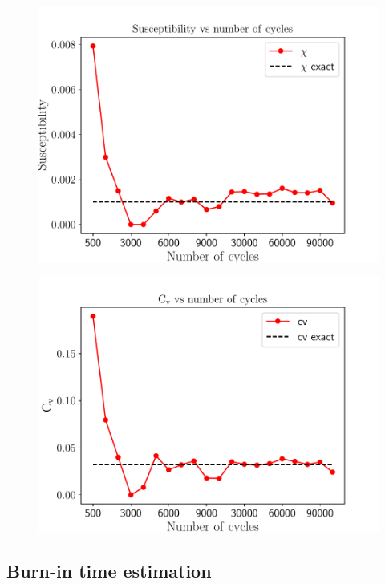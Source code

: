 \documentclass[english,notitlepage,reprint,nofootinbib]{revtex4-2}  %
\begin{document}
	\begin{figure}[h!]
		\centering
		\includegraphics[scale=0.55]{figures/chi_problem4.pdf}
		\caption{}
		\label{fig:chi4}
	\end{figure}

	\begin{figure}[h!]
		\centering
		\includegraphics[scale=0.55]{figures/CV_problem4.pdf}
		\caption{}
		\label{fig:cv4}
	\end{figure}
	
	\subsection{Burn-in time estimation}\label{subsec: burn in estimation}
	
\end{document}
